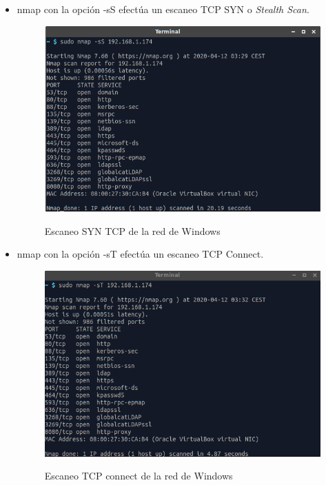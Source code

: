 \documentclass[10pt,a4paper]{article}
\begin{document}
\begin{enumerate}[label=\textbf{\alph*)}]
\begin{itemize}
\item nmap con la opción -sS efectúa un escaneo TCP SYN o \textit{Stealth Scan}.
\begin{figure}[h!]
  \centering
  \includegraphics[scale=0.4]{k3.png}\\
  \caption{Escaneo SYN TCP de la red de Windows}
  \label{fig:nmap3}
\end{figure}
\pagebreak
\item nmap con la opción -sT efectúa un escaneo TCP Connect.
\begin{figure}[h!]
  \centering
  \includegraphics[scale=0.4]{k4.png}\\
  \caption{Escaneo TCP connect de la red de Windows}
  \label{fig:nmap4}
\end{figure}


\end{itemize}
\end{enumerate}
\end{document}
